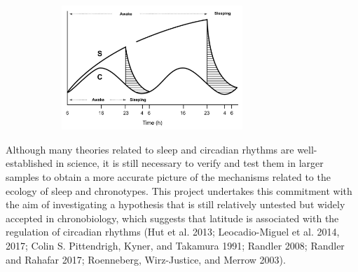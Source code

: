 \documentclass[
  12pt,
  a4paper,
  oneside]{tesesusp}
\begin{document}
\begin{figure}

\caption{\label{fig-ch-1-borbely-1982-figure-4}Illustration of the
interaction of the \(\text{S}\) process and the \(\text{C}\) process in
sleep regulation. The figure depicts two scenarios: one without sleep
deprivation and another with sleep deprivation. The \(y\)-axis
represents the level of process.\\
Adaptation based on A. A. Borbély (1982).}

{\centering 

\begin{figure}[H]

{\centering \includegraphics[width=0.75\textwidth,height=\textheight]{images/borbely-1982-figure-4.jpg}

}

\end{figure}

}

\end{figure}

Although many theories related to sleep and circadian rhythms are
well-established in science, it is still necessary to verify and test
them in larger samples to obtain a more accurate picture of the
mechanisms related to the ecology of sleep and chronotypes. This project
undertakes this commitment with the aim of investigating a hypothesis
that is still relatively untested but widely accepted in chronobiology,
which suggests that latitude is associated with the regulation of
circadian rhythms (Hut et al. 2013; Leocadio-Miguel et al. 2014, 2017;
Colin S. Pittendrigh, Kyner, and Takamura 1991; Randler 2008; Randler
and Rahafar 2017; Roenneberg, Wirz-Justice, and Merrow 2003).
\end{document}
